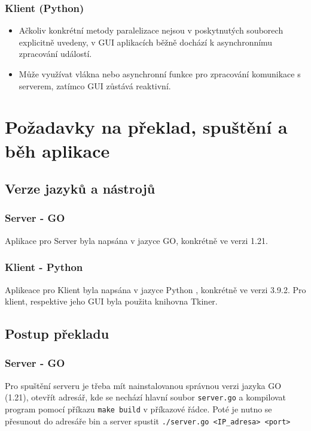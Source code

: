 \documentclass{article}
\begin{document}
\subsubsection{Klient (Python)}
\begin{itemize}
  \item Ačkoliv konkrétní metody paralelizace nejsou v poskytnutých souborech explicitně uvedeny, v GUI aplikacích běžně dochází k asynchronnímu zpracování událostí. 
  \item Může využívat vlákna nebo asynchronní funkce pro zpracování komunikace s serverem, zatímco GUI zůstává reaktivní.
\end{itemize}

\section{Požadavky na překlad, spuštění a běh aplikace}
\subsection{Verze jazyků a nástrojů}

\subsubsection{Server - GO}

Aplikace pro Server byla napsána v jazyce GO, konkrétně ve verzi 1.21.

\subsubsection{Klient - Python}

Aplikeace pro Klient byla napsána v jazyce Python , konkrétně ve verzi 3.9.2. Pro klient, respektive jeho GUI byla použita knihovna Tkiner.

\subsection{Postup překladu}

\subsubsection{Server - GO}

Pro spuštění serveru je třeba mít nainstalovanou správnou verzi jazyka GO (1.21), otevřít adresář, kde se nechází hlavní soubor \texttt{server.go} a kompilovat program pomocí příkazu \texttt{make build} v příkazové řádce. Poté je nutno se přesunout do adresáře bin a server spustit \texttt{./server.go <IP\_adresa> <port>}
\end{document}
